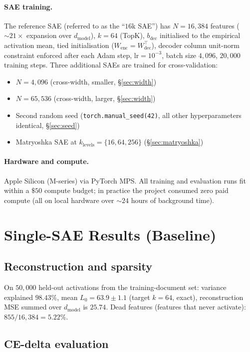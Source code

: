 \documentclass[11pt]{article}
\begin{document}
\paragraph{SAE training.}
The reference SAE (referred to as the ``$16$k SAE'') has $N = 16{,}384$
features ($\sim 21 \times$ expansion over $d_{\text{model}}$), $k = 64$
(TopK), $b_{\text{dec}}$ initialised to the empirical activation mean,
tied initialisation ($W_{\text{enc}} = W_{\text{dec}}^\top$), decoder
column unit-norm constraint enforced after each Adam step, $\text{lr} =
10^{-3}$, batch size $4{,}096$, $20{,}000$ training steps.
Three additional SAEs are trained for cross-validation:
\begin{itemize}
\item $N = 4{,}096$ (cross-width, smaller, \S\ref{sec:width})
\item $N = 65{,}536$ (cross-width, larger, \S\ref{sec:width})
\item Second random seed (\texttt{torch.manual\_seed(42)}, all other
hyperparameters identical, \S\ref{sec:seed})
\item Matryoshka SAE at $k_{\text{levels}} = \{16, 64, 256\}$
(\S\ref{sec:matryoshka})
\end{itemize}

\paragraph{Hardware and compute.}
Apple Silicon (M-series) via PyTorch MPS. All training and evaluation runs
fit within a $\$50$ compute budget; in practice the project consumed zero
paid compute (all on local hardware over $\sim 24$ hours of
background time).

\section{Single-SAE Results (Baseline)}

\subsection{Reconstruction and sparsity}

On $50{,}000$ held-out activations from the training-document set:
variance explained $98.43\%$, mean $L_0 = 63.9 \pm 1.1$ (target $k=64$,
exact), reconstruction MSE summed over $d_{\text{model}}$ is $25.74$.
Dead features (features that never activate): $855 / 16{,}384 = 5.22\%$.

\subsection{CE-delta evaluation}
\label{sec:ce-delta}
\end{document}
